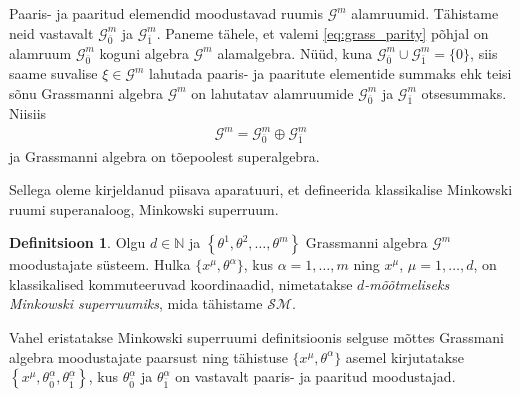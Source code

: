 \documentclass[12pt]{article}
\theoremstyle{plain}
\theoremstyle{definition}
\newtheorem{definitsioon}{Definitsioon}[section]
\numberwithin{equation}{section}
\def\N{{\mathbb N}}
\def\G{{\mathcal G}}
\def\SM{{\mathcal {SM}}}
\begin{document}
Paaris- ja paaritud elemendid moodustavad ruumis $\G^m$ alamruumid. 
Tähistame neid vastavalt $\G^{m}_{\overline{0}}$ ja 
$\G^{m}_{\overline{1}}$. Paneme tähele, et valemi
\ref{eq:grass_parity} põhjal on alamruum $\G^{m}_{\overline{0}}$ 
koguni algebra $\G^m$ alamalgebra. Nüüd, kuna 
$\G^{m}_{\overline{0}} \cup \G^{m}_{\overline{1}} = \{0\}$, siis 
saame suvalise $\xi \in \G^m$ lahutada paaris- ja paaritute 
elementide summaks ehk teisi sõnu Grassmanni algebra $\G^m$ on 
lahutatav alamruumide $\G^{m}_{\overline{0}}$ ja 
$\G^{m}_{\overline{1}}$ otsesummaks. Niisiis 
\begin{align*}
\G^m = \G^{m}_{\overline{0}} \oplus \G^{m}_{\overline{1}}
\end{align*}
ja Grassmanni algebra on tõepoolest superalgebra.

Sellega oleme kirjeldanud piisava aparatuuri, et defineerida
klassikalise Minkowski ruumi superanaloog, Minkowski superruum. 

\begin{definitsioon}
Olgu $d \in \N$ ja 
$\left\lbrace\theta^1, \theta^2, \ldots, \theta^m\right\rbrace$
Grassmanni algebra $\G^m$ moodustajate süsteem. 
Hulka $\{x^{\mu}, \theta^\alpha\}$, kus $\alpha = 1, \ldots, m$ ning 
$x^{\mu}$, $\mu = 1, \ldots, d$, on klassikalised kommuteeruvad 
koordinaadid, nimetatakse \emph{$d$-mõõtmeliseks Minkowski 
superruumiks}, mida tähistame $\SM$.
\end{definitsioon}

Vahel eristatakse Minkowski superruumi definitsioonis
selguse mõttes Grassmani algebra moodustajate paarsust ning 
tähistuse $\{x^{\mu}, \theta^\alpha\}$ asemel kirjutatakse 
$\left\lbrace x^{\mu}, \theta_{\overline{0}}^{\alpha}, 
\theta_{\overline{1}}^{\alpha} \right\rbrace$, kus 
$\theta_{\overline{0}}^{\alpha}$ 
ja $\theta_{\overline{1}}^{\alpha}$ on vastavalt paaris- ja paaritud 
moodustajad.
\end{document}
